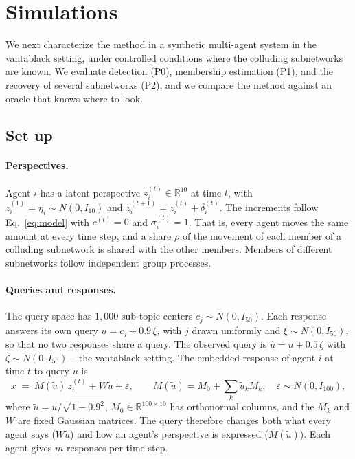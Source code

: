 \documentclass{article}
\theoremstyle{plain}
\theoremstyle{definition}
\newcommand{\R}{\mathbb{R}}
\begin{document}
\section{Simulations}
\label{sec:sims}

We next characterize the method in a synthetic multi-agent system in the vantablack setting, under controlled conditions where the colluding subnetworks are known. We evaluate detection (P0), membership estimation (P1), and the recovery of several subnetworks (P2), and we compare the method against an oracle that knows where to look.

\subsection{Set up}
\label{sec:sim-model}

\paragraph{Perspectives.} Agent $i$ has a latent perspective $z_i^{(t)}\in\R^{10}$ at time $t$, with $z_i^{(1)}=\eta_i\sim N(0,I_{10})$ and $z_i^{(t+1)} = z_i^{(t)}+\delta_i^{(t)}$. The increments follow Eq.~\eqref{eq:model} with $c^{(t)}=0$ and $\sigma_i^{(t)}=1$. That is, every agent moves the same amount at every time step, and a share $\rho$ of the movement of each member of a colluding subnetwork is shared with the other members. Members of different subnetworks follow independent group processes.

\paragraph{Queries and responses.} The query space has $1{,}000$ sub-topic centers $c_j\sim N(0,I_{50})$. Each response answers its own query $u=c_j+0.9\,\xi$, with $j$ drawn uniformly and $\xi\sim N(0,I_{50})$, so that no two responses share a query. The observed query is $\hat u = u + 0.5\,\zeta$ with $\zeta\sim N(0,I_{50})$ -- the vantablack setting. The embedded response of agent $i$ at time $t$ to query $u$ is
\begin{equation}
x \;=\; M(\tilde u)\, z_i^{(t)} + W\tilde u + \varepsilon,\qquad M(\tilde u) = M_0 + \textstyle\sum_k \tilde u_k M_k,\quad \varepsilon\sim N(0,I_{100}),
\end{equation}
where $\tilde u = u/\sqrt{1+0.9^2}$, $M_0\in\R^{100\times 10}$ has orthonormal columns, and the $M_k$ and $W$ are fixed Gaussian matrices. The query therefore changes both what every agent says ($W\tilde u$) and how an agent's perspective is expressed ($M(\tilde u)$). Each agent gives $m$ responses per time step.
\end{document}
